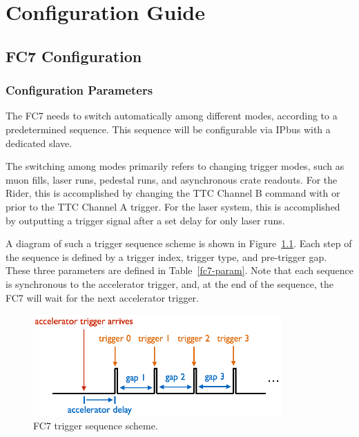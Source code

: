 \part{Configuration Guide}
{
\setlength{\parskip}{0em}
\DoPToC
}


\chapter{FC7 Configuration}

\section{Configuration Parameters}

The FC7 needs to switch automatically among different modes, according to a predetermined sequence.  This sequence will be configurable via IPbus with a dedicated slave.

The switching among modes primarily refers to changing trigger modes, such as muon fills, laser runs, pedestal runs, and asynchronous crate readouts.  For the Rider, this is accomplished by changing the TTC Channel B command with or prior to the TTC Channel A trigger.  For the laser system, this is accomplished by outputting a trigger signal after a set delay for only laser runs.

A diagram of such a trigger sequence scheme is shown in Figure~\ref{trig-seq}.  Each step of the sequence is defined by a trigger index, trigger type, and pre-trigger gap.  These three parameters are defined in Table~\ref{fc7-param}.  Note that each sequence is synchronous to the accelerator trigger, and, at the end of the sequence, the FC7 will wait for the next accelerator trigger.

\begin{figure}[b]
\centering
\includegraphics[width=0.85\textwidth]{images/trigger_sequence.png}
\caption{FC7 trigger sequence scheme.}
\label{trig-seq}
\end{figure}

